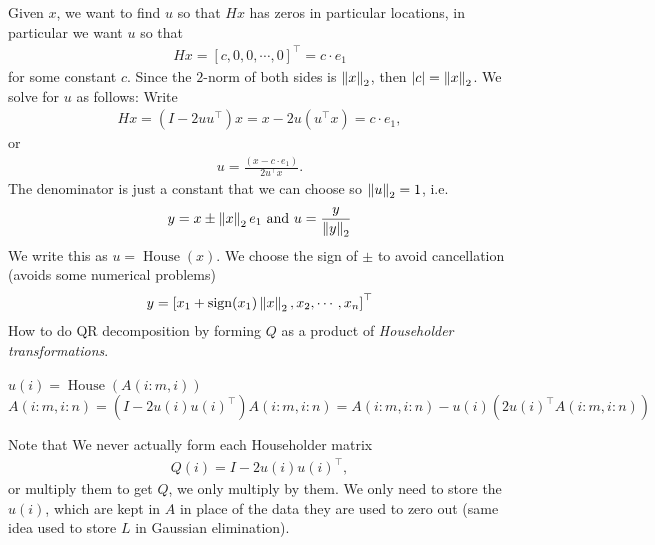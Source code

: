 \documentclass[11pt]{article}
\numberwithin{equation}{section}
\begin{document}
Given $x$, we want to find $u$ so that $Hx$ has zeros in particular locations, in particular we want $u$ so that \begin{align*}
    Hx = \left[ c,0,0,\cdots, 0 \right]^\top = c \cdot e_1
\end{align*}
for some constant $c$. Since the $2$-norm of both sides is $\left\| x \right\|_2$, then $|c| = \left\| x \right\|_2$. We solve for $u$ as follows: Write \begin{align*}
    Hx = (I-2uu^\top)x = x - 2u(u^\top x) = c \cdot e_1,
\end{align*}
or 
\begin{align*}
    u = \frac{(x - c\cdot e_1)}{2u^\top x}.
\end{align*}
The denominator is just a constant that we can choose so $\left\| u \right\|_2 = 1$, i.e. \begin{align*}
    y = x \pm \left\| x \right\|_2 e_1 \text{ and }u = \frac{y}{\left\| y \right\|_2}
\end{align*}
We write this as $u = \operatorname{House}(x)$. We choose the sign of $\pm$ to avoid cancellation (avoids some numerical problems) \begin{align*}
    y = \left[ x_1 + \operatorname{sign}(x_1) \left\| x \right\|_2, x_2, \cdots, x_n \right]^\top
\end{align*}
How to do QR decomposition by forming $Q$ as a product of \textit{Householder transformations}.
\begin{algorithmfrm}
    \begin{algorithmic}[1]
            \State $u(i) = \operatorname{House}(A(i:m,i))$
            \State $A(i:m,i:n) = (I - 2u(i)u(i)^\top)A(i:m,i:n)= A(i:m,i:n) - u(i)(2u(i)^\top A(i:m,i:n))$
        \EndFor
    \end{algorithmic}
\end{algorithmfrm}
Note that We never actually form each Householder matrix \begin{align*}
    Q(i) = I-2u(i)u(i)^\top,
\end{align*}
or multiply them to get $Q$, we only multiply by them.
We only need to store the $u(i)$, which are kept in $A$ in place of the data they are used to zero out (same idea used to store $L$ in Gaussian elimination).
\end{document}
